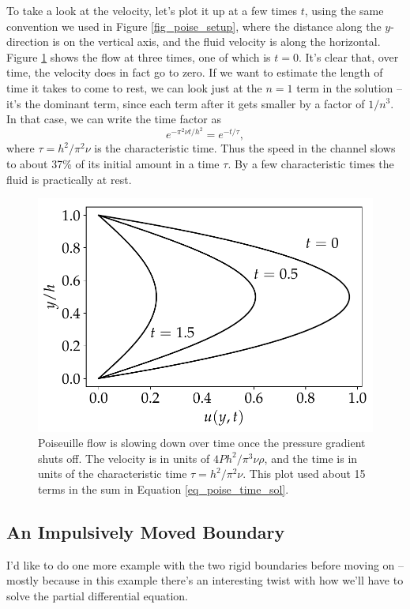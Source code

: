 To take a look at the velocity, let's plot it up at a few times $t$, using the same convention we used in Figure \ref{fig_poise_setup}, where the distance along the $y$-direction is on the vertical axis, and the fluid velocity is along the horizontal.  Figure \ref{fig_poise_time} shows the flow at three times, one of which is $t=0$.  It's clear that, over time, the velocity does in fact go to zero.  If we want to estimate the length of time it takes to come to rest, we can look just at the $n=1$ term in the solution -- it's the dominant term, since each term after it gets smaller by a factor of $1/n^3$.  In that case, we can write the time factor as
\[
e^{-\pi^2 \nu t/h^2} = e^{-t/\tau},
\]
where $\tau = h^2/\pi^2 \nu$ is the characteristic time.  Thus the speed in the channel slows to about 37\% of its initial amount in a time $\tau$.  By a few characteristic times the fluid is practically at rest.

\begin{figure}
\centering
\includegraphics[width=0.7\linewidth]{Figures/Chapter2/fig_poise_time}
\caption{Poiseuille flow is slowing down over time once the pressure gradient shuts off. The velocity is in units of $4Ph^2 /\pi^3 \nu \rho$, and the time is in units of the characteristic time  $\tau = h^2 / \pi^2 \nu$. This plot used about 15 terms in the sum in Equation \ref{eq_poise_time_sol}.}
\label{fig_poise_time}
\end{figure}


\subsection{An Impulsively Moved Boundary}
\label{sec_imp}

I'd like to do one more example with the two rigid boundaries before moving on -- mostly because in this example there's an interesting twist with how we'll have to solve the partial differential equation.


